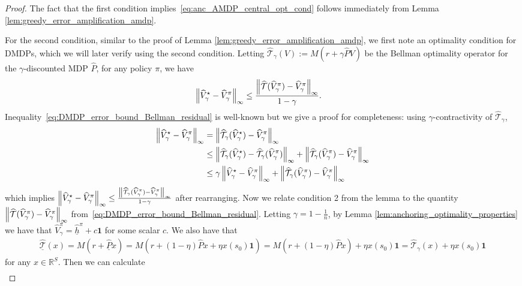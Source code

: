 \documentclass{article}
\theoremstyle{plain}
\theoremstyle{plain}
\theoremstyle{remark}
\theoremstyle{plain}
\theoremstyle{plain}
\newcommand{\R}{\mathbb{R}}
\newcommand{\Phat}{\widehat{P}}
\newcommand{\Vhat}{\widehat{V}}
\newcommand{\one}{\mathbf{1}}
\newcommand{\hhat}{\widehat{h}}
\newcommand{\Phatanc}{\underline{\Phat}}
\newcommand{\hhatanc}{\underline{\hhat}}
\newcommand{\Thatanc}{\underline{\widehat{\mathcal{T}}}}
\newcommand{\That}{\widehat{\mathcal{T}}}
\begin{document}
\begin{proof}
    The fact that the first condition implies~\eqref{eq:anc_AMDP_central_opt_cond} follows immediately from Lemma \ref{lem:greedy_error_amplification_amdp}.

    For the second condition, similar to the proof of Lemma \ref{lem:greedy_error_amplification_amdp}, we first note an optimality condition for DMDPs, which we will later verify using the second condition. Letting $\That_\gamma(V) := M(r + \gamma \Phat V)$ be the Bellman optimality operator for the $\gamma$-discounted MDP $\Phat$, for any policy $\pi$, we have
    \begin{align}
        \infnorm{\Vhat_\gamma^\star - \Vhat_\gamma^\pi} & \leq \frac{\infnorm{\That(\Vhat_\gamma^\pi) - \Vhat_\gamma^\pi}}{1-\gamma}. \label{eq:DMDP_error_bound_Bellman_residual}
    \end{align}
    Inequality~\eqref{eq:DMDP_error_bound_Bellman_residual} is well-known but we give a proof for completeness: using $\gamma$-contractivity of $\That_\gamma$,
    \begin{align*}
        \infnorm{\Vhat_\gamma^\star - \Vhat_\gamma^\pi} &= \infnorm{\That_\gamma (\Vhat_\gamma^\star) - \Vhat_\gamma^\pi} \\
            & \leq \infnorm{\That_\gamma(\Vhat_\gamma^\star) - \That_\gamma(\Vhat_\gamma^\pi)} + \infnorm{\That_\gamma(\Vhat_\gamma^\pi) - \Vhat_\gamma^\pi} \\
            & \leq \gamma \infnorm{\Vhat_\gamma^\star - \Vhat_\gamma^\pi} + \infnorm{\That_\gamma(\Vhat_\gamma^\pi) - \Vhat_\gamma^\pi}
    \end{align*}
        which implies $\infnorm{\Vhat_\gamma^\star - \Vhat_\gamma^\pi} \leq \frac{\infnorm{\That_\gamma(\Vhat_\gamma^\pi) - \Vhat_\gamma^\pi}}{1-\gamma}$ after rearranging. Now we relate condition 2 from the lemma to the quantity $\infnorm{\That(\Vhat_\gamma^\pi) - \Vhat_\gamma^\pi}$ from~\eqref{eq:DMDP_error_bound_Bellman_residual}. Letting $\gamma = 1-\frac{1}{n}$, by Lemma \ref{lem:anchoring_optimality_properties} we have that $\Vhat_\gamma^\pi = \hhatanc^\pi + c \one$ for some scalar $c$. We also have that 
        \begin{align*}
            \Thatanc(x) = M(r + \Phatanc x) = M(r + (1-\eta)\Phat x + \eta x(s_0) \one ) = M(r + (1-\eta)\Phat x  ) + \eta x(s_0) \one = \That_\gamma(x)  + \eta x(s_0) \one
        \end{align*}
        for any $x \in \R^S$.
        Then we can calculate
        \begin{align}

\end{align}
\end{proof}
\end{document}
